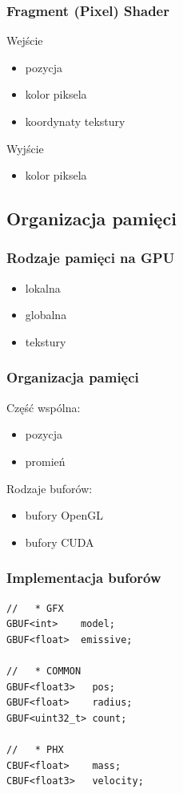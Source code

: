 \documentclass{beamer}
\begin{document}
\frame
{
	\frametitle{Fragment (Pixel) Shader}

	\begin{block}{Wejście}
	\begin{itemize}
	\item pozycja
	\item kolor piksela
	\item koordynaty tekstury
	\end{itemize}
	\end{block}
	\begin{block}{Wyjście}
	\begin{itemize}
	\item kolor piksela
	\end{itemize}
	\end{block}
}

\subsection{Organizacja pamięci}\label{sub:organizacja pamięci}
\frame
{
	\frametitle{Rodzaje pamięci na GPU}

	\begin{itemize}
	\item lokalna
	\item globalna
	\item tekstury
	\end{itemize}
}

\frame
{
	\frametitle{Organizacja pamięci}

	Część wspólna:
	\begin{itemize}
	\item pozycja
	\item promień
	\end{itemize}

	\pause
	Rodzaje buforów:

	\begin{itemize}
	\item bufory OpenGL
	\item bufory CUDA
	\end{itemize}

}

\begin{frame}[fragile]
	\frametitle{Implementacja buforów}
	\begin{verbatim}
//   * GFX
GBUF<int>    model;
GBUF<float>  emissive;

//   * COMMON
GBUF<float3>   pos;
GBUF<float>    radius;
GBUF<uint32_t> count;

//   * PHX
CBUF<float>    mass;
CBUF<float3>   velocity;
	\end{verbatim}
\end{frame}
\end{document}
